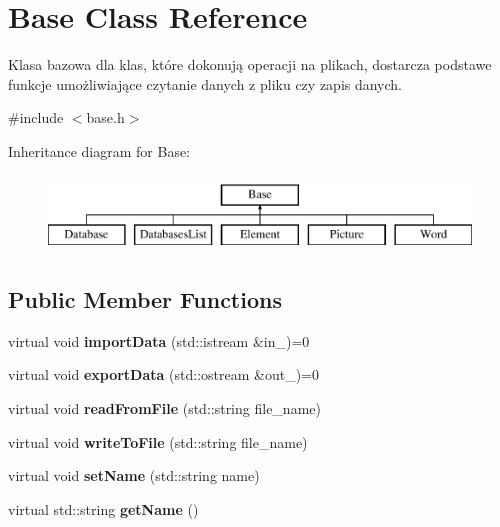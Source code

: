 \hypertarget{class_base}{}\section{Base Class Reference}
\label{class_base}


Klasa bazowa dla klas, które dokonują operacji na plikach, dostarcza podstawe funkcje umożliwiające czytanie danych z pliku czy zapis danych.  




{\ttfamily \#include $<$base.\+h$>$}

Inheritance diagram for Base\+:\begin{figure}[H]
\begin{center}
\leavevmode
\includegraphics[height=2.000000cm]{class_base}
\end{center}
\end{figure}
\subsection*{Public Member Functions}
\begin{DoxyCompactItemize}
\item 
\mbox{\label{class_base_a7b4b21d52b3d3247744e0ee1e4f63586}} 
virtual void {\bfseries import\+Data} (std\+::istream \&in\+\_\+)=0
\item 
\mbox{\label{class_base_a88840038845318752f245aeec2ea4a68}} 
virtual void {\bfseries export\+Data} (std\+::ostream \&out\+\_\+)=0
\item 
\mbox{\label{class_base_ac414e12b727e044fd3a56ca6d8c1d4e6}} 
virtual void {\bfseries read\+From\+File} (std\+::string file\+\_\+name)
\item 
\mbox{\label{class_base_ae878e796ec7e77f33ebee2048f961551}} 
virtual void {\bfseries write\+To\+File} (std\+::string file\+\_\+name)
\item 
\mbox{\label{class_base_a4d31c87adaa91feaecf96d09825caacc}} 
virtual void {\bfseries set\+Name} (std\+::string name)
\item 
\mbox{\label{class_base_abc24d7d976d415e2facc4e2d2cc0730d}} 
virtual std\+::string {\bfseries get\+Name} ()
\end{DoxyCompactItemize}
